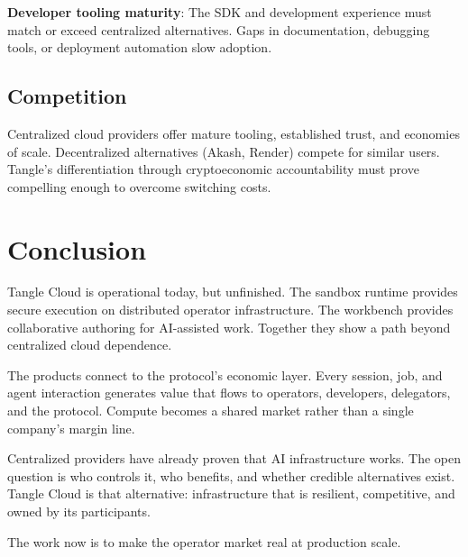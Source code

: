 \documentclass[11pt,a4paper]{article}
\begin{document}
\textbf{Developer tooling maturity}: The SDK and development experience must match or exceed centralized alternatives. Gaps in documentation, debugging tools, or deployment automation slow adoption.

\subsection{Competition}

Centralized cloud providers offer mature tooling, established trust, and economies of scale. Decentralized alternatives (Akash, Render) compete for similar users. Tangle's differentiation through cryptoeconomic accountability must prove compelling enough to overcome switching costs.

\section{Conclusion}

Tangle Cloud is operational today, but unfinished. The sandbox runtime provides secure execution on distributed operator infrastructure. The workbench provides collaborative authoring for AI-assisted work. Together they show a path beyond centralized cloud dependence.

The products connect to the protocol's economic layer. Every session, job, and agent interaction generates value that flows to operators, developers, delegators, and the protocol. Compute becomes a shared market rather than a single company's margin line.

Centralized providers have already proven that AI infrastructure works. The open question is who controls it, who benefits, and whether credible alternatives exist. Tangle Cloud is that alternative: infrastructure that is resilient, competitive, and owned by its participants.

The work now is to make the operator market real at production scale.
\end{document}
